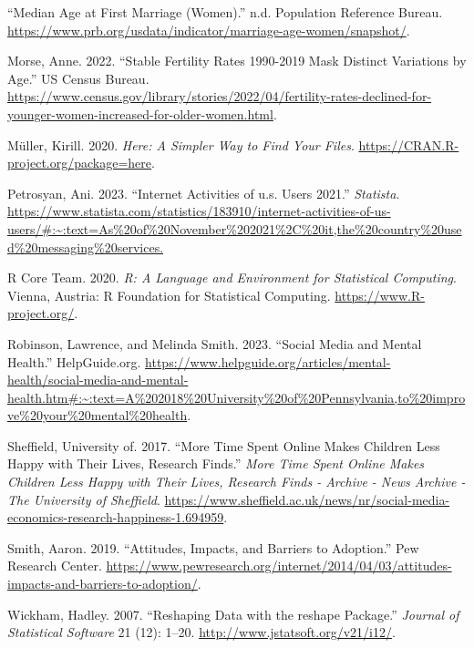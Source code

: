 \documentclass[
]{article}
\newlength{\cslhangindent}
\newlength{\cslentryspacingunit} %
\newenvironment{CSLReferences}[2] %
 {%
  \setlength{\parindent}{0pt}
  \ifodd #1
  \let\oldpar\par
  \def\par{\hangindent=\cslhangindent\oldpar}
  \fi
  \setlength{\parskip}{#2\cslentryspacingunit}
 }%
 {}
\begin{document}
\begin{CSLReferences}{1}{0}
\leavevmode{}%
{``Median Age at First Marriage (Women).''} n.d. Population Reference
Bureau.
\url{https://www.prb.org/usdata/indicator/marriage-age-women/snapshot/}.

\leavevmode{}%
Morse, Anne. 2022. {``Stable Fertility Rates 1990-2019 Mask Distinct
Variations by Age.''} US Census Bureau.
\url{https://www.census.gov/library/stories/2022/04/fertility-rates-declined-for-younger-women-increased-for-older-women.html}.

\leavevmode{}%
Müller, Kirill. 2020. \emph{Here: A Simpler Way to Find Your Files}.
\url{https://CRAN.R-project.org/package=here}.

\leavevmode{}%
Petrosyan, Ani. 2023. {``Internet Activities of u.s. Users 2021.''}
\emph{Statista}.
\url{https://www.statista.com/statistics/183910/internet-activities-of-us-users/\#:~:text=As\%20of\%20November\%202021\%2C\%20it,the\%20country\%20used\%20messaging\%20services.}

\leavevmode{}%
R Core Team. 2020. \emph{R: A Language and Environment for Statistical
Computing}. Vienna, Austria: R Foundation for Statistical Computing.
\url{https://www.R-project.org/}.

\leavevmode{}%
Robinson, Lawrence, and Melinda Smith. 2023. {``Social Media and Mental
Health.''} HelpGuide.org.
\url{https://www.helpguide.org/articles/mental-health/social-media-and-mental-health.htm\#:~:text=A\%202018\%20University\%20of\%20Pennsylvania,to\%20improve\%20your\%20mental\%20health}.

\leavevmode{}%
Sheffield, University of. 2017. {``More Time Spent Online Makes Children
Less Happy with Their Lives, Research Finds.''} \emph{More Time Spent
Online Makes Children Less Happy with Their Lives, Research Finds -
Archive - News Archive - The University of Sheffield}.
\url{https://www.sheffield.ac.uk/news/nr/social-media-economics-research-happiness-1.694959}.

\leavevmode{}%
Smith, Aaron. 2019. {``Attitudes, Impacts, and Barriers to Adoption.''}
Pew Research Center.
\url{https://www.pewresearch.org/internet/2014/04/03/attitudes-impacts-and-barriers-to-adoption/}.

\leavevmode{}%
Wickham, Hadley. 2007. {``Reshaping Data with the {reshape} Package.''}
\emph{Journal of Statistical Software} 21 (12): 1--20.
\url{http://www.jstatsoft.org/v21/i12/}.


\end{CSLReferences}
\end{document}
